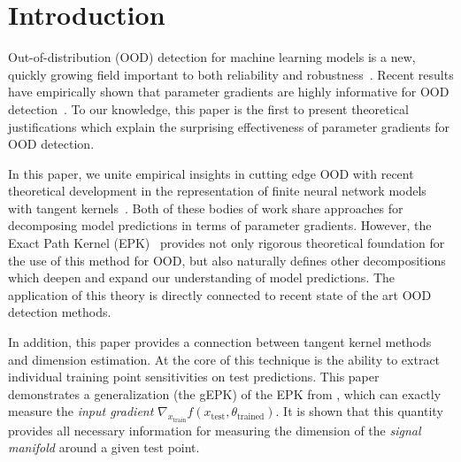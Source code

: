 


\section{Introduction}

Out-of-distribution (OOD) detection for machine learning models is a new, quickly growing field important to both reliability and robustness~\citep{hendrycks2019, biggio2014, hendrycks2017, desilva2023, yang2021, filos2020autonomous}.
Recent results have empirically shown that parameter gradients are highly informative for OOD detection~\citep{behpour2023, djurisic2023extremely, huang2021}.
To our knowledge, this paper is the first to present theoretical justifications which explain the surprising effectiveness of parameter gradients for OOD detection.

In this paper, we unite empirical insights in cutting edge OOD with recent theoretical development in the representation of finite neural network models with tangent kernels~\citep{bell2023,chen2021equivalence,domingos2020}. 
Both of these bodies of work share approaches for decomposing model predictions in terms of parameter gradients. 
However, the Exact Path Kernel (EPK)~\citep{bell2023} provides not only rigorous theoretical foundation for the use of this method for OOD, but also naturally defines other decompositions which deepen and expand our understanding of model predictions. The application of this theory is directly connected to recent state of the art OOD detection methods.

In addition, this paper provides a connection between tangent kernel methods and dimension estimation.
At the core of this technique is the ability to extract individual training point sensitivities on test predictions.
This paper demonstrates a generalization (the gEPK) of the EPK from \citet{bell2023},  which can exactly measure the \emph{input gradient} $\nabla_{x_\text{train}}f(x_\text{test}, \theta_\text{trained})$.
It is shown that this quantity provides all necessary information for measuring the dimension of the \textit{signal manifold} \citet{srinivas2023} around a given test point.

